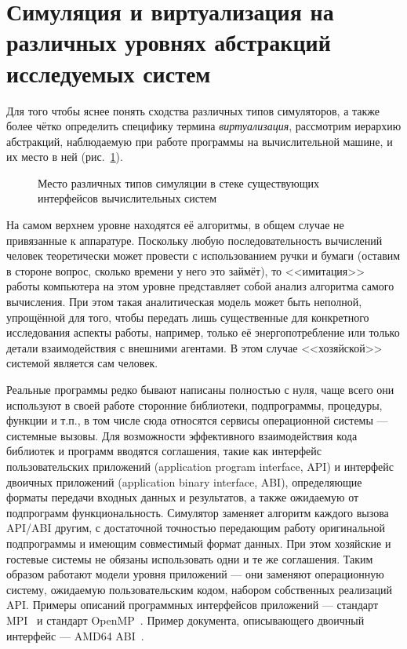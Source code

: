 \section[Симуляция и виртуализация на различных уровнях]{Симуляция и виртуализация на различных уровнях абстракций исследуемых систем}

Для того чтобы яснее понять сходства различных типов симуляторов, а также более чётко определить специфику термина \emph{виртуализация}, рассмотрим иерархию абстракций, наблюдаемую при работе программы на вычислительной машине, и их место в ней (рис.~\ref{fig:simulation-levels}). 

\begin{figure}[htb]
    \centering
    \caption[Место различных типов симуляции]{Место различных типов симуляции в стеке существующих интерфейсов вычислительных систем}
    \label{fig:simulation-levels}
\end{figure}

На самом верхнем уровне находятся её алгоритмы, в общем случае не привязанные к аппаратуре. Поскольку любую последовательность вычислений человек теоретически может провести с использованием ручки и бумаги (оставим в стороне вопрос, сколько времени у него это займёт), то <<имитация>> работы компьютера на этом уровне представляет собой анализ алгоритма самого вычисления. При этом такая аналитическая модель может быть неполной, упрощённой для того, чтобы передать лишь существенные для конкретного исследования аспекты работы, например, только её энергопотребление или только детали взаимодействия с внешними агентами. В этом случае <<хозяйской>> системой является сам человек.

Реальные программы редко бывают написаны полностью с нуля, чаще всего они используют в своей работе сторонние библиотеки, подпрограммы, процедуры, функции и т.п., в том числе сюда относятся сервисы операционной системы --- системные вызовы. Для возможности эффективного взаимодействия кода библиотек и программ вводятся соглашения, такие как интерфейс пользовательских приложений (\abbr application program interface, API) и интерфейс двоичных приложений (\abbr application binary interface, ABI), определяющие форматы передачи входных данных и результатов, а также ожидаемую от подпрограмм функциональность. Симулятор заменяет алгоритм каждого вызова API/ABI другим, с достаточной точностью передающим работу оригинальной подпрограммы и имеющим совместимый формат данных. При этом хозяйские и гостевые системы не обязаны использовать одни и те же соглашения. Таким образом работают модели уровня приложений --- они заменяют операционную систему, ожидаемую пользовательским кодом, набором собственных реализаций API. Примеры описаний программных интерфейсов приложений --- стандарт MPI~\cite{mpi2std} и стандарт OpenMP~\cite{openmp}. Пример документа, описывающего двоичный интерфейс --- AMD64 ABI~\cite{x86-64-abi}.

